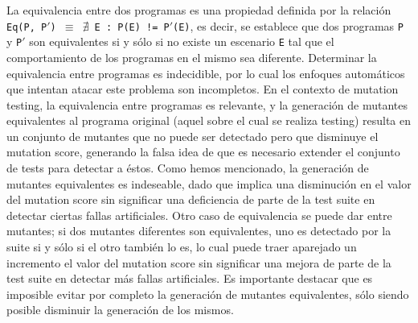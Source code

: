 La equivalencia entre dos programas es una propiedad definida por la relaci\'on \texttt{Eq(P, P$\prime$) $\equiv$ $\nexists$ E : P(E) != P$\prime$(E)}, es decir, se establece que dos programas \texttt{P} y \texttt{P$\prime$} son equivalentes  si y s\'olo si no existe un escenario \texttt{E} tal que el comportamiento de los programas en el mismo sea diferente. Determinar la equivalencia entre programas es indecidible, por lo cual los enfoques autom\'aticos que intentan atacar este problema son incompletos. En el contexto de mutation testing, la equivalencia entre programas es relevante, y la generaci\'on de mutantes equivalentes al programa original (aquel sobre el cual se realiza testing) resulta en un conjunto de mutantes que no puede ser detectado pero que disminuye el mutation score, generando la falsa idea de que es necesario extender el conjunto de tests para detectar a \'estos. Como hemos mencionado, la generaci\'on de mutantes equivalentes es indeseable, dado que implica una disminuci\'on en el valor del mutation score sin significar una deficiencia de parte de la test suite en detectar ciertas fallas artificiales. Otro caso de equivalencia se puede dar entre mutantes; si dos mutantes diferentes son equivalentes, uno es detectado por la suite si y s\'olo si el otro tambi\'en lo es, lo cual puede traer aparejado un incremento el valor del mutation score sin significar una mejora de parte de la test suite en detectar m\'as fallas artificiales. Es importante destacar que es imposible evitar por completo la generaci\'on de mutantes equivalentes, s\'olo siendo posible disminuir la generaci\'on de los mismos.

